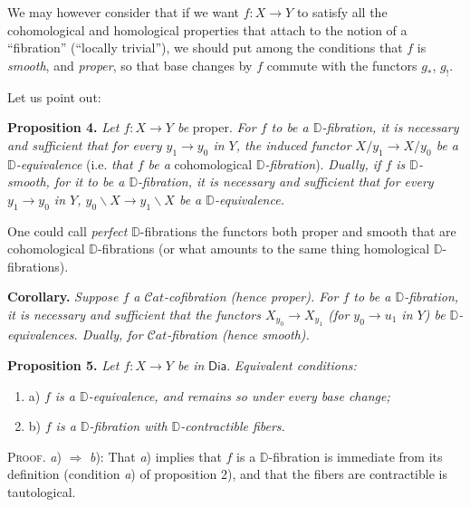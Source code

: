 \documentclass[11pt]{article}
\newcommand{\printedpage}[1]{\marginpar{\footnotesize p.~#1}}
\newcommand{\msp}[1]{\marginpar{\footnotesize [#1]}}
\newcommand{\DD}{\mathbb{D}}
\newcommand{\Cat}{\mathcal{C}at}
\newcommand{\Dia}{\mathsf{Dia}}
\begin{document}
\indent We may however consider that if we want $f : X \to Y$ to satisfy all the cohomological and homological properties that attach to the notion of a ``fibration'' (``locally trivial''), we should put among the conditions that $f$ is \textit{smooth}, and \textit{proper}, so that base changes by $f$ commute with the functors $g_*$, $g_!$. %

\printedpage{51}

\msp{page 83}

Let us point out:

\textbf{Proposition 4.} \textit{Let $f : X \to Y$ be} proper. \textit{For $f$ to be a $\DD$-fibration, it is necessary and sufficient that for every $y_1 \to y_0$ in $Y$, the induced functor $X/y_1 \to X/y_0$ be a $\DD$-equivalence} (i.e. \textit{that $f$ be a} cohomological \textit{$\DD$-fibration}). \textit{Dually, if $f$ is $\DD$-smooth, for it to be a $\DD$-fibration, it is necessary and sufficient that for every $y_1 \to y_0$ in $Y$, $y_0\backslash X \to y_1\backslash X$ be a $\DD$-equivalence.}

\indent One could call \textit{perfect} $\DD$-fibrations the functors both proper and smooth that are cohomological $\DD$-fibrations (or what amounts to the same thing homological $\DD$-fibrations).

\textbf{Corollary.} \textit{Suppose $f$ a $\Cat$-cofibration (hence proper). For $f$ to be a $\DD$-fibration, it is necessary and sufficient that the functors $X_{y_0} \to X_{y_1}$ (for $y_0 \to u_1$ in $Y$) be $\DD$-equivalences. Dually, for $\Cat$-fibration (hence smooth).} %

\textbf{Proposition 5.} \textit{Let $f : X \to Y$ be in} $\Dia$. \textit{Equivalent conditions:}
\begin{enumerate}[label={}, leftmargin=2em, labelsep=0pt]
\item a) \textit{$f$ is a $\DD$-equivalence, and remains so under every base change;}
\item b) \textit{$f$ is a $\DD$-fibration with $\DD$-contractible fibers.}
\end{enumerate}

\textsc{Proof.} \textit{a}) $\Rightarrow$ \textit{b}): That \textit{a}) implies that $f$ is a $\DD$-fibration is immediate from its definition (condition \textit{a}) of proposition 2), and that the fibers are contractible is tautological.
\end{document}
